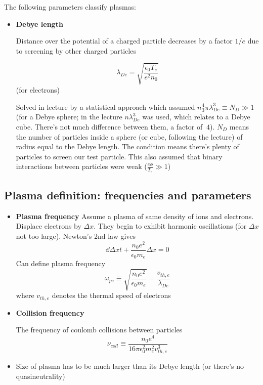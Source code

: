 \documentclass[PlasmaNotes.tex]{subfiles}
\begin{document}
	The following parameters classify plasmas:
		\begin{itemize}
			\item \textbf{Debye length}
			
			Distance over the potential of a charged particle decreases by a factor $1/e$ due to screening by other charged particles
			
			\[\lambda_{De} = \sqrt{\frac{\epsilon_0 T_e}{e^2 n_0}} \] (for electrons)
			
			Solved in lecture by a statistical approach which assumed $n\frac{4}{3}\pi \lambda_{De}^3 \equiv N_D \gg 1$ (for a Debye sphere; in the lecture $n \lambda_{De}^3$ was used, which relates to a Debye cube. There's not much difference between them, a factor of $~4$). $N_D$  means the number of particles inside a sphere (or cube, following the lecture) of radius equal to the Debye length. The condition means there's plenty of particles to screen our test particle. This also assumed that binary interactions between particles were weak ($\frac{e \phi}{T_e} \gg 1$)
			\end{itemize}
	\subsection{Plasma definition: frequencies and parameters}
\begin{itemize}
\item \textbf{Plasma frequency}
Assume a plasma of same density of ions and electrons. Displace electrons by $\Delta x$. They begin to exhibit harmonic oscillations (for $\Delta x$ not too large). Newton's 2nd law gives
\[\dd{\Delta x}{t} + \frac{n_0 e^2}{\epsilon_0 m_e}\Delta x = 0\]
Can define plasma frequency
\[\omega_{pe}\equiv\sqrt{\frac{n_0 e^2}{\epsilon_0 m_e}}=\frac{v_{th,e}}{\lambda_{De}}\]
where $v_{th,e}$ denotes the thermal speed of electrons
\item \textbf{Collision frequency}
	
	The frequency of coulomb collisions between particles
	\[\nu_{coll} \equiv \frac{n_0 e^4}{16 \pi \epsilon_0^2 m_e^2 v_{th,e}^3}\]
	
	\item Size of plasma has to be much larger than its Debye length (or there's no quasineutrality)
	\end{itemize}
	
\end{document}
